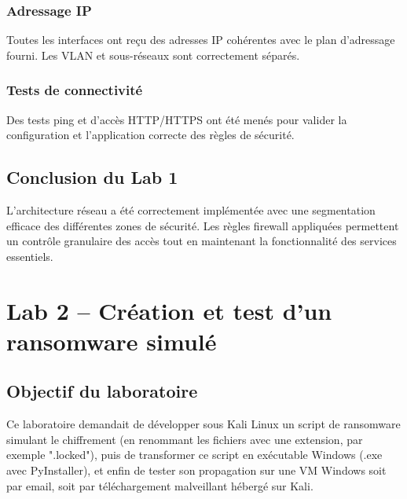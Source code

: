 \documentclass[12pt,a4paper]{article}
\begin{document}
	\subsubsection{Adressage IP}
	Toutes les interfaces ont reçu des adresses IP cohérentes avec le plan d'adressage fourni. Les VLAN et sous-réseaux sont correctement séparés.
	
	\subsubsection{Tests de connectivité}
	Des tests ping et d'accès HTTP/HTTPS ont été menés pour valider la configuration et l'application correcte des règles de sécurité.
	
	\subsection{Conclusion du Lab 1}
	L'architecture réseau a été correctement implémentée avec une segmentation efficace des différentes zones de sécurité. Les règles firewall appliquées permettent un contrôle granulaire des accès tout en maintenant la fonctionnalité des services essentiels.
	
	\section{Lab 2 – Création et test d'un ransomware simulé}
	
	\subsection{Objectif du laboratoire}
	Ce laboratoire demandait de développer sous Kali Linux un script de ransomware simulant le chiffrement (en renommant les fichiers avec une extension, par exemple ".locked"), puis de transformer ce script en exécutable Windows (.exe avec PyInstaller), et enfin de tester son propagation sur une VM Windows soit par email, soit par téléchargement malveillant hébergé sur Kali.
	
\end{document}
